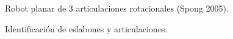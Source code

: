 \documentclass[a4paper,12pt]{article}
\begin{document}
\begin{figure}[H]
    \centering
    \begin{adjustbox}{scale = 0.5, max width=\columnwidth}
    \end{adjustbox}
    \caption{Robot planar de 3 articulaciones rotacionales (Spong 2005).}
\end{figure}

\begin{figure}[H]
    \centering
    \begin{adjustbox}{scale = 0.5, max width=\columnwidth}
    \end{adjustbox}
    \caption{Identificación de eslabones y articulaciones.}
\end{figure}
\end{document}
